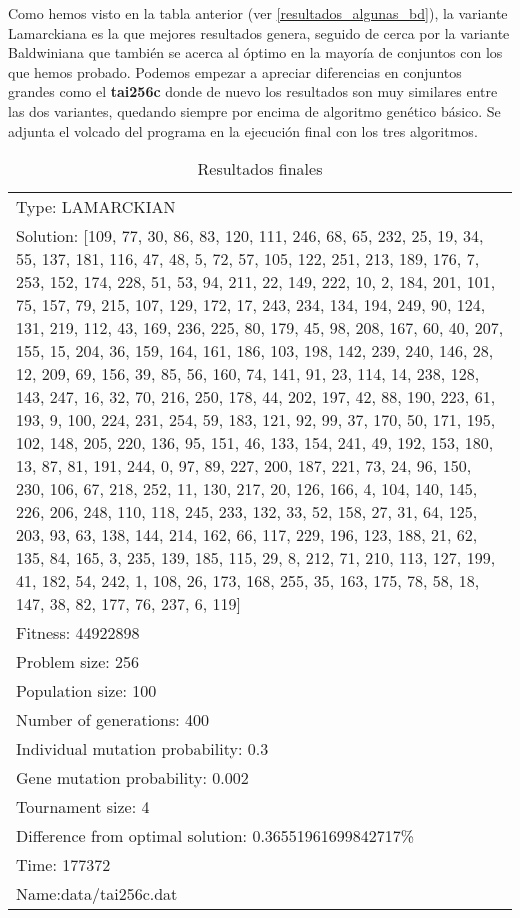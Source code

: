 Como hemos visto en la tabla anterior (ver \ref{resultados_algunas_bd}), la variante Lamarckiana es la que mejores resultados genera, seguido de cerca por la variante Baldwiniana que también se acerca al óptimo en la mayoría de conjuntos con los que hemos probado. Podemos empezar a apreciar diferencias en conjuntos grandes como el \textbf{tai256c} donde de nuevo los resultados son muy similares entre las dos variantes, quedando siempre por encima de algoritmo genético básico. Se adjunta el volcado del programa en la ejecución final con los tres algoritmos.


\begin{table}[ht!]
\centering

\label{resultados:e1}
\begin{tabular}{ l }
Type: LAMARCKIAN\\
Solution: [109, 77, 30, 86, 83, 120, 111, 246, 68, 65, 232, 25, 19, 34, 55, 137, 181, 116, 47, 48, 5, 72, 57, 105, 122, 251, 213, 189, 176, 7, 253, 152, 174, 228, 51, 53, 94, 211, 22, 149, 222, 10, 2, 184, 201, 101, 75, 157, 79, 215, 107, 129, 172, 17, 243, 234, 134, 194, 249, 90, 124, 131, 219, 112, 43, 169, 236, 225, 80, 179, 45, 98, 208, 167, 60, 40, 207, 155, 15, 204, 36, 159, 164, 161, 186, 103, 198, 142, 239, 240, 146, 28, 12, 209, 69, 156, 39, 85, 56, 160, 74, 141, 91, 23, 114, 14, 238, 128, 143, 247, 16, 32, 70, 216, 250, 178, 44, 202, 197, 42, 88, 190, 223, 61, 193, 9, 100, 224, 231, 254, 59, 183, 121, 92, 99, 37, 170, 50, 171, 195, 102, 148, 205, 220, 136, 95, 151, 46, 133, 154, 241, 49, 192, 153, 180, 13, 87, 81, 191, 244, 0, 97, 89, 227, 200, 187, 221, 73, 24, 96, 150, 230, 106, 67, 218, 252, 11, 130, 217, 20, 126, 166, 4, 104, 140, 145, 226, 206, 248, 110, 118, 245, 233, 132, 33, 52, 158, 27, 31, 64, 125, 203, 93, 63, 138, 144, 214, 162, 66, 117, 229, 196, 123, 188, 21, 62, 135, 84, 165, 3, 235, 139, 185, 115, 29, 8, 212, 71, 210, 113, 127, 199, 41, 182, 54, 242, 1, 108, 26, 173, 168, 255, 35, 163, 175, 78, 58, 18, 147, 38, 82, 177, 76, 237, 6, 119]\\
Fitness: 44922898\\
Problem size: 256\\
Population size: 100\\
Number of generations: 400\\
Individual mutation probability: 0.3\\
Gene mutation probability: 0.002\\
Tournament size: 4\\
Difference from optimal solution: 0.36551961699842717\%\\
Time: 177372\\
Name:data/tai256c.dat\\
\end{tabular}
\caption{Resultados finales}
\end{table}

